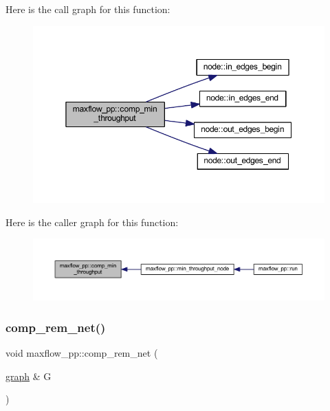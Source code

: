 Here is the call graph for this function\+:\nopagebreak
\begin{figure}[H]
\begin{center}
\leavevmode
\includegraphics[width=350pt]{classmaxflow__pp_ab1146e40ae2f2405e0ca6ea3ff43a6ff_cgraph}
\end{center}
\end{figure}
Here is the caller graph for this function\+:\nopagebreak
\begin{figure}[H]
\begin{center}
\leavevmode
\includegraphics[width=350pt]{classmaxflow__pp_ab1146e40ae2f2405e0ca6ea3ff43a6ff_icgraph}
\end{center}
\end{figure}
\mbox{\label{classmaxflow__pp_a97612b9517f0f11715610cb8faa81606}} 
\subsubsection{\texorpdfstring{comp\+\_\+rem\+\_\+net()}{comp\_rem\_net()}}
{\footnotesize\ttfamily void maxflow\+\_\+pp\+::comp\+\_\+rem\+\_\+net (\begin{DoxyParamCaption}\item[{\mbox{\hyperlink{classgraph}{graph}} \&}]{G }\end{DoxyParamCaption})\hspace{0.3cm}{\ttfamily [protected]}}



